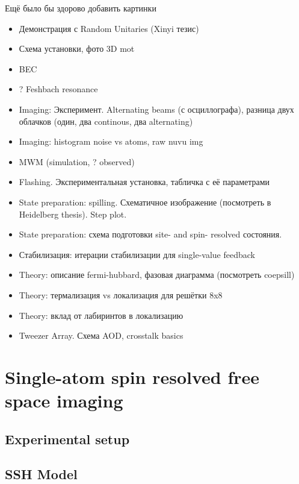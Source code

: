 \documentclass[twoside]{article}
\begin{document}







 
Ещё было бы здорово добавить картинки

\begin{itemize}
	\item Демонстрация с Random Unitaries (Xinyi тезис)
	\item Схема установки, фото 3D mot
	\item BEC
	\item ? Feshbach resonance
	\item Imaging: Эксперимент. Alternating beams (с осциллографа), разница двух облачков (один, два continous, два alternating)
	\item Imaging: histogram noise vs atoms, raw nuvu img
	\item MWM (simulation, ? observed)
	\item Flashing. Экспериментальная установка, табличка с её параметрами
	\item State preparation: spilling. Схематичное изображение (посмотреть в Heidelberg thesis). Step plot. 
	\item State preparation: схема подготовки site- and spin- resolved состояния.
	\item Стабилизация: итерации стабилизации для single-value feedback
	\item Theory: описание fermi-hubbard, фазовая диаграмма (посмотреть coepsill)
	\item Theory: термализация vs локализация для решётки 8x8
	\item Theory: вклад от лабиринтов в локализацию
	\item Tweezer Array. Схема AOD, crosstalk basics
\end{itemize}



\section{Single-atom spin resolved free space imaging}

\subsection{Experimental setup}


\subsection{SSH Model}

\end{document}
